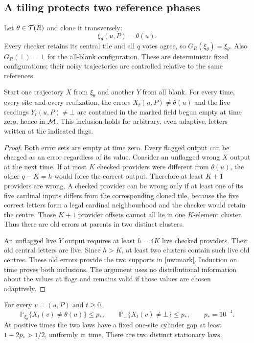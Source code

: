 \subsection{A tiling protects two reference phases}

Let $\theta\in\mathcal T(R)$ and clone it transversely:
\[
 \xi_\theta(u,P)=\theta(u).
\]
Every checker retains its central tile and all $q$ votes agree, so $G_R(\xi_\theta)=\xi_\theta$. Also $G_R(\bot)=\bot$ for the all-blank configuration. These are deterministic fixed configurations; their noisy trajectories are controlled relative to the same references.

\begin{lemma}\label{nw:memorycover}
Start one trajectory $X$ from $\xi_\theta$ and another $Y$ from all blank. For every time, every site and every realization, the errors $X_t(u,P)\ne\theta(u)$ and the live readings $Y_t(u,P)\ne\bot$ are contained in the marked field begun empty at time zero, hence in $\mathcal M$. This inclusion holds for arbitrary, even adaptive, letters written at the indicated flags.
\end{lemma}
\begin{proof}
Both error sets are empty at time zero. Every flagged output can be charged as an error regardless of its value. Consider an unflagged wrong $X$ output at the next time. If at most $K$ checked providers were different from $\theta(u)$, the other $q-K=h$ would force the correct output. Therefore at least $K+1$ providers are wrong. A checked provider can be wrong only if at least one of its five cardinal inputs differs from the corresponding cloned tile, because the five correct letters form a legal cardinal neighbourhood and the checker would retain the centre. Those $K+1$ provider offsets cannot all lie in one $K$-element cluster. Thus there are old errors at parents in two distinct clusters.

An unflagged live $Y$ output requires at least $h=4K$ live checked providers. Their old central letters are live. Since $h>K$, at least two clusters contain such live old centres. These old errors provide the two supports in \eqref{nw:mark}. Induction on time proves both inclusions. The argument uses no distributional information about the values at flags and remains valid if those values are chosen adaptively.
\end{proof}

\begin{lemma}\label{nw:memory}
For every $v=(u,P)$ and $t\ge0$,
\begin{equation}\label{nw:memorybounds}
  \mathbb{P}_{\xi_\theta}\{X_t(v)\ne\theta(u)\}\le p_*,\qquad
  \mathbb{P}_{\bot}\{X_t(v)\ne\bot\}\le p_*,\qquad p_*=10^{-4}.
\end{equation}
At positive times the two laws have a fixed one-site cylinder gap at least $1-2p_*>1/2$, uniformly
in time. There are two distinct stationary laws.
\end{lemma}

